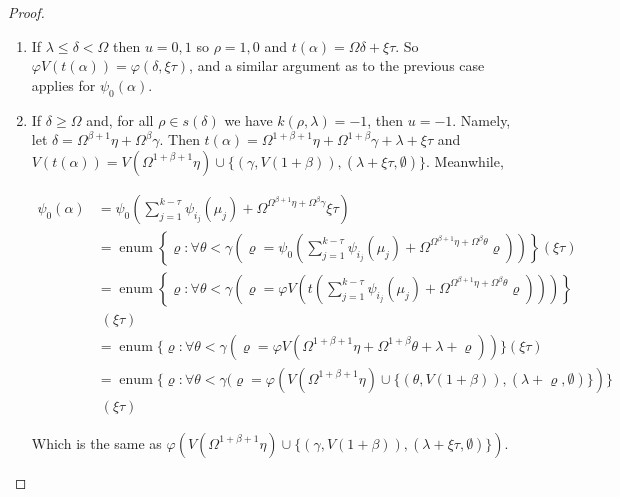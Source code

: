 \documentclass{article}
\theoremstyle{definition}
\theoremstyle{plain}
\theoremstyle{plain}
\theoremstyle{plain}
\theoremstyle{plain}
\theoremstyle{remark}
\theoremstyle{remark}
\theoremstyle{remark}
\theoremstyle{plain}
\theoremstyle{plain}
\begin{document}
\begin{proof}
\begin{enumerate}
\begin{enumerate}
\begin{enumerate}
\begin{enumerate}
                \item If $\lambda \leq \delta < \Omega$ then $u = 0, 1$ so $\rho = 1, 0$ and $t(\alpha) = \Omega \delta + \xi \tau$. So $\varphi V(t(\alpha)) = \varphi(\delta, \xi \tau)$, and a similar argument as to the previous case applies for $\psi_0(\alpha)$. 
                
                \item If $\delta \geq \Omega$ and, for all $\rho \in s(\delta)$ we have $k(\rho, \lambda) = -1$, then $u = -1$. Namely, let $\delta = \Omega^{\beta+1} \eta + \Omega^\beta \gamma$. Then $t(\alpha) = \Omega^{1+\beta+1} \eta + \Omega^{1+\beta} \gamma + \lambda + \xi \tau$ and $V(t(\alpha)) = V(\Omega^{1+\beta+1} \eta) \cup \{(\gamma, V(1+\beta)), (\lambda + \xi \tau, \emptyset)\}$. Meanwhile,
        
                \begin{equation}
                \begin{split}
                \psi_0(\alpha) & = \psi_0\left(\sum_{j = 1}^{k-\tau} \psi_{i_j}(\mu_j) + \Omega^{\Omega^{\beta+1} \eta + \Omega^\beta \gamma} \xi \tau\right) \\ & = \operatorname{enum}\left\{\varrho: \forall \theta < \gamma \left(\varrho = \psi_0\left(\sum_{j = 1}^{k-\tau} \psi_{i_j}(\mu_j) + \Omega^{\Omega^{\beta+1} \eta + \Omega^\beta \theta} \varrho\right)\right)\right\}(\xi \tau) \\ & = \operatorname{enum}\left\{\varrho: \forall \theta < \gamma \left(\varrho = \varphi V\left(t\left(\sum_{j = 1}^{k-\tau} \psi_{i_j}(\mu_j) + \Omega^{\Omega^{\beta+1} \eta + \Omega^\beta \theta} \varrho\right)\right)\right)\right\} \\ & \; (\xi \tau) \\ & = \operatorname{enum}\{\varrho: \forall \theta < \gamma (\varrho = \varphi V(\Omega^{1+\beta+1} \eta + \Omega^{1+\beta} \theta + \lambda + \varrho))\}(\xi \tau) \\ & = \operatorname{enum}\{\varrho: \forall \theta < \gamma (\varrho = \varphi (V(\Omega^{1+\beta+1} \eta) \cup \{(\theta, V(1+\beta)), (\lambda + \varrho, \emptyset)\})\} \\ & \; (\xi \tau)
                \end{split}
                \end{equation}
        
                Which is the same as $\varphi (V(\Omega^{1+\beta+1} \eta) \cup \{(\gamma, V(1+\beta)), (\lambda + \xi \tau, \emptyset)\})$.
        

\end{enumerate}
\end{enumerate}
\end{enumerate}
\end{enumerate}
\end{proof}
\end{document}
